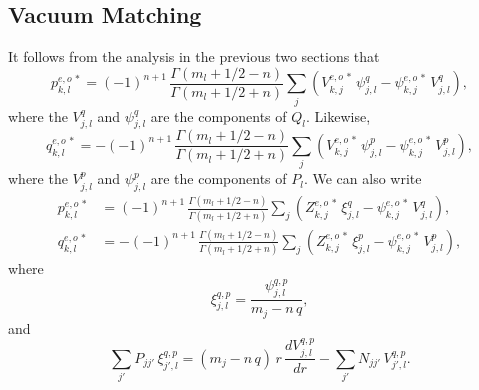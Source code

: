 \documentclass[12pt,prb,aps,notitlepage]{revtex4-1}
\begin{document}
\subsection{Vacuum Matching}
It follows from the analysis in the previous two sections that
\begin{equation}
p_{k,l}^{e,o\,\ast}= (-1)^{n+1}\,\frac{\Gamma(m_l+1/2-n)}{\Gamma(m_l+1/2+n)}\sum_{j} \left(V_{k,j}^{e,o\,\ast}\,\psi_{j,l}^q
-\psi_{k,j}^{e,o\,\ast}\,V_{j,l}^q\right),
\end{equation}
where the $V_{j,l}^q$ and $\psi_{j,l}^q$ are the components of $Q_l$. Likewise,
\begin{equation}
q_{k,l}^{e,o\,\ast}= -(-1)^{n+1}\,\frac{\Gamma(m_l+1/2-n)}{\Gamma(m_l+1/2+n)}\sum_{j} \left(V_{k,j}^{e,o\,\ast}\,\psi_{j,l}^p
-\psi_{k,j}^{e,o\,\ast}\,V_{j,l}^p\right),
\end{equation}
where the $V_{j,l}^p$ and $\psi_{j,l}^p$ are the components of $P_l$. We can also write
\begin{align}
p_{k,l}^{e,o\,\ast}&= (-1)^{n+1}\,\frac{\Gamma(m_l+1/2-n)}{\Gamma(m_l+1/2+n)}\sum_{j} \left(Z_{k,j}^{e,o\,\ast}\,\xi_{j,l}^q
-\psi_{k,j}^{e,o\,\ast}\,V_{j,l}^q\right),\\[0.5ex]
q_{k,l}^{e,o\,\ast}&= -(-1)^{n+1}\,\frac{\Gamma(m_l+1/2-n)}{\Gamma(m_l+1/2+n)}\sum_{j} \left(Z_{k,j}^{e,o\,\ast}\,\xi_{j,l}^p
-\psi_{k,j}^{e,o\,\ast}\,V_{j,l}^p\right),
\end{align}
where
\begin{equation}
\xi^{q,p}_{j,l} = \frac{\psi_{j,l}^{q,p}}{m_j-n\,q},
\end{equation}
and
\begin{equation}
\sum_{j'} P_{jj'}\,\xi_{j',l}^{q,p} = (m_j-n\,q)\,r\,\frac{d V_{j,l}^{q,p}}{dr}-\sum_{j'} N_{jj'}\,V_{j',l}^{q,p}.
\end{equation}
\end{document}
